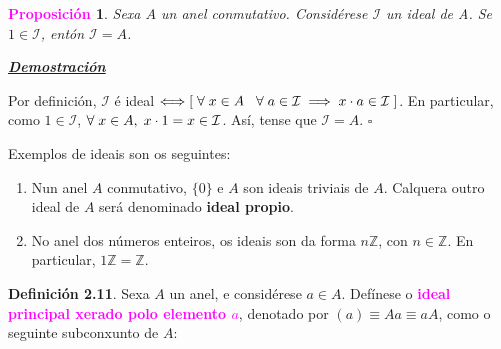 \documentclass[twoside]{report}
\newcommand{\magbf}[1]{\textcolor{magenta}{\textbf{#1}}} %
\theoremstyle{mystyle}
\newtheorem{prop}{\magbf{Proposición}}[chapter]
\newenvironment{proposition}
{\begin{mdframed}[linecolor = magenta,backgroundcolor = classicrose, linewidth = 2mm]\begin{prop}}
{\end{prop}\end{mdframed}}
\begin{document}
\begin{proposition} \label{prop2.2}
Sexa $A$ un anel conmutativo. Considérese $\mathcal{I}$ un ideal de A. Se $1 \in \mathcal{I}$, entón $\mathcal{I} = A$.
\end{proposition}

\vspace{2mm}

\noindent \textbf{\textit{\underline{Demostración}}}

\vspace{2mm}

\noindent Por definición, $\mathcal{I}$ é ideal $\Longleftrightarrow [\hspace{1mm} \forall \hspace{1mm} x \in A \hspace{3mm} \forall \hspace{1mm} a \in \mathcal{I} \implies x \cdot a \in \mathcal{I} \hspace{1mm}]$. En particular, como $1 \in \mathcal{I}$, $\forall \hspace{1mm} x \in A, \hspace{1mm} x \cdot 1 = x\in \mathcal{I}$. Así, tense que $\mathcal{I} = A$. $\square$\\

\vspace{3mm}

\noindent Exemplos de ideais son os seguintes:

\begin{enumerate}
    \item Nun anel $A$ conmutativo, $\{0\}$ e $A$ son ideais triviais de $A$. Calquera outro ideal de $A$ será denominado \textbf{ideal propio}.
    \item No anel dos números enteiros, os ideais son da forma $n\mathbb{Z}$, con $n \in \mathbb{Z}$. En particular, $1\mathbb{Z} = \mathbb{Z}$.\\
\end{enumerate}

\noindent \textbf{Definición 2.11}. Sexa $A$ un anel, e considérese $a \in A$. Defínese o \magbf{ideal principal xerado polo elemento $a$}, denotado por $(a) \equiv Aa \equiv aA$, como o seguinte subconxunto de $A$:

\begin{center}
\end{center}
\end{document}
